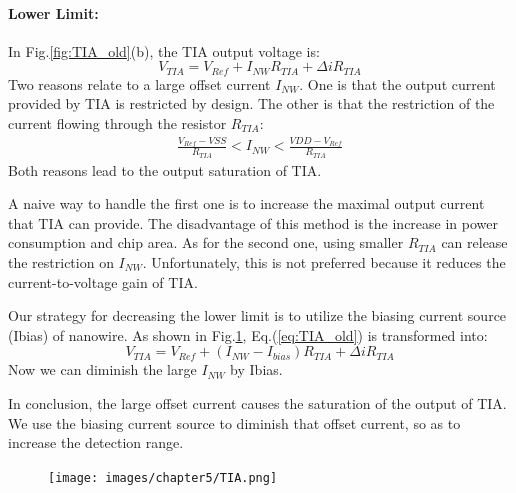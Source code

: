 \paragraph*{Lower Limit:}
In Fig.\ref{fig:TIA_old}(b), the TIA output voltage is:
\begin{equation}
    V_{TIA} = V_{Ref} + I_{NW}R_{TIA} + \Delta iR_{TIA}
    \label{eq:TIA_old}
\end{equation}
Two reasons relate to a large offset current $I_{NW}$.
One is that the output current provided by TIA is restricted by design.
The other is that the restriction of the current flowing through the resistor $R_{TIA}$:
\begin{align}
    \frac{V_{Ref} - VSS}{R_{TIA}} < I_{NW} < \frac{VDD - V_{Ref}}{R_{TIA}}
\end{align}
Both reasons lead to the output saturation of TIA.

A naive way to handle the first one is to increase the maximal output current that TIA can provide.
The disadvantage of this method is the increase in power consumption and chip area.
As for the second one, using smaller $R_{TIA}$ can release the restriction on $I_{NW}$.
Unfortunately, this is not preferred because it reduces the current-to-voltage gain of TIA.

Our strategy for decreasing the lower limit is to utilize the biasing current source (Ibias) of nanowire.
As shown in Fig.\ref{fig:TIA}, Eq.(\ref{eq:TIA_old}) is transformed into:
\begin{equation}
    V_{TIA} = V_{Ref} + (I_{NW} - I_{bias}) R_{TIA} + \Delta iR_{TIA}
    \label{eq:TIA}
\end{equation}
Now we can diminish the large $I_{NW}$ by Ibias.

In conclusion, the large offset current causes the saturation of the output of TIA.
We use the biasing current source to diminish that offset current, so as to increase the detection range.

\begin{figure}[!htbp]
    \centering
        \texttt{[image: images/chapter5/TIA.png]}
    \caption{}
    \label{fig:TIA}
\end{figure}
